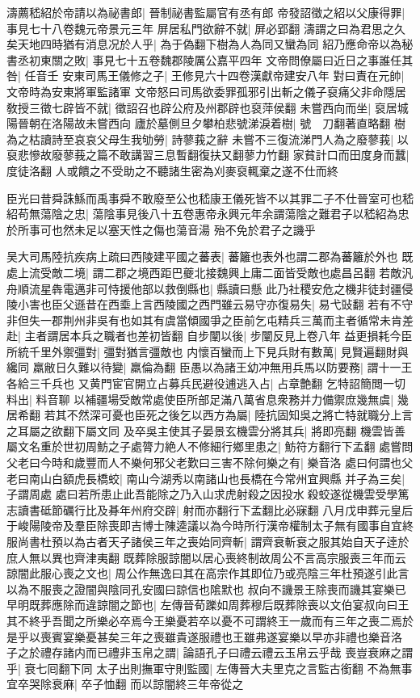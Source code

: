 濤薦嵇紹於帝請以為祕書郎|{
	晉制祕書監屬官有丞有郎}
帝發詔徵之紹以父康得罪|{
	事見七十八卷魏元帝景元三年}
屏居私門欲辭不就|{
	屏必郢翻}
濤謂之曰為君思之久矣天地四時猶有消息况於人乎|{
	為于偽翻下樹為人為同又蠻為同}
紹乃應命帝以為秘書丞初東關之敗|{
	事見七十五卷魏郡陵厲公嘉平四年}
文帝問僚屬曰近日之事誰任其咎|{
	任音壬}
安東司馬王儀修之子|{
	王修見六十四卷漢獻帝建安八年}
對曰責在元帥|{
	文帝時為安東將軍監諸軍}
文帝怒曰司馬欲委罪孤邪引出斬之儀子裒痛父非命隱居敎授三徵七辟皆不就|{
	徵詔召也辟公府及州郡辟也裒萍侯翻}
未嘗西向而坐|{
	裒居城陽晉朝在洛陽故未嘗西向}
廬於墓側旦夕攀柏悲號涕淚着樹|{
	號　刀翻著直略翻}
樹為之枯讀詩至哀哀父母生我劬勞|{
	詩蓼莪之辭}
未嘗不三復流涕門人為之廢蓼莪|{
	以裒悲慘故廢蓼莪之篇不敢講習三息暫翻復扶又翻蓼力竹翻}
家貧計口而田度身而蠶|{
	度徒洛翻}
人或饋之不受助之不聽諸生密為刈麥裒輒棄之遂不仕而終

臣光曰昔舜誅鯀而禹事舜不敢廢至公也嵇康王儀死皆不以其罪二子不仕晉室可也嵇紹苟無蕩陰之忠|{
	蕩陰事見後八十五卷惠帝永興元年余謂蕩陰之難君子以嵇紹為忠於所事可也然未足以塞天性之傷也蕩音湯}
殆不免於君子之譏乎

吴大司馬陸抗疾病上疏曰西陵建平國之蕃表|{
	蕃籬也表外也謂二郡為蕃籬於外也}
既處上流受敵二境|{
	謂二郡之境西距巴夔北接魏興上庸二面皆受敵也處昌呂翻}
若敵汎舟順流星犇電邁非可恃援他部以救倒縣也|{
	縣讀曰懸}
此乃社稷安危之機非徒封疆侵陵小害也臣父遜昔在西埀上言西陵國之西門雖云易守亦復易失|{
	易弋䜴翻}
若有不守非但失一郡荆州非吳有也如其有虞當傾國爭之臣前乞屯精兵三萬而主者循常未肯差赴|{
	主者謂居本兵之職者也差初皆翻}
自步闡以後|{
	步闡反見上卷八年}
益更損耗今臣所統千里外禦彊對|{
	彊對猶言彊敵也}
内懷百蠻而上下見兵財有數萬|{
	見賢遍翻財與纔同}
羸敝日久難以待變|{
	羸倫為翻}
臣愚以為諸王幼冲無用兵馬以防要務|{
	謂十一王各給三千兵也}
又黄門宦官開立占募兵民避役逋逃入占|{
	占章艶翻}
乞特詔簡閲一切料出|{
	料音聊}
以補疆場受敵常處使臣所部足滿八萬省息衆務并力備禦庶幾無虞|{
	幾居希翻}
若其不然深可憂也臣死之後乞以西方為屬|{
	陸抗固知吳之將亡特就職分上言之耳屬之欲翻下屬文同}
及卒吳主使其子晏景玄機雲分將其兵|{
	將即亮翻}
機雲皆善屬文名重於世初周魴之子處膂力絶人不修細行鄉里患之|{
	魴符方翻行下孟翻}
處嘗問父老曰今時和歲豐而人不樂何邪父老歎曰三害不除何樂之有|{
	樂音洛}
處曰何謂也父老曰南山白額虎長橋蛟|{
	南山今湖秀以南諸山也長橋在今常州宜興縣}
并子為三矣|{
	子謂周處}
處曰若所患止此吾能除之乃入山求虎射殺之因投水殺蛟遂從機雲受學篤志讀書砥節礪行比及朞年州府交辟|{
	射而亦翻行下孟翻比必寐翻}
八月戊申葬元皇后于峻陽陵帝及羣臣除喪即吉博士陳逵議以為今時所行漢帝權制太子無有國事自宜終服尚書杜預以為古者天子諸侯三年之喪始同齊斬|{
	謂齊衰斬衰之服其始自天子逹於庶人無以異也齊津夷翻}
既葬除服諒闇以居心喪終制故周公不言高宗服喪三年而云諒闇此服心喪之文也|{
	周公作無逸曰其在高宗作其即位乃或亮陰三年杜預遂引此言以為不服喪之證闇與陰同孔安國曰諒信也隂默也}
叔向不譏景王除喪而譏其宴樂已早明既葬應除而違諒闇之節也|{
	左傳晉荀躒如周葬穆后既葬除喪以文伯宴叔向曰王其不終乎吾聞之所樂必卒焉今王樂憂若卒以憂不可謂終王一歲而有三年之喪二焉於是乎以喪賓宴樂憂甚矣三年之喪雖貴遂服禮也王雖弗遂宴樂以早亦非禮也樂音洛}
子之於禮存諸内而已禮非玉帛之謂|{
	論語孔子曰禮云禮云玉帛云乎哉}
喪豈衰麻之謂乎|{
	衰七囘翻下同}
太子出則撫軍守則監國|{
	左傳晉大夫里克之言監古銜翻}
不為無事宜卒哭除衰麻|{
	卒子恤翻}
而以諒闇終三年帝從之

